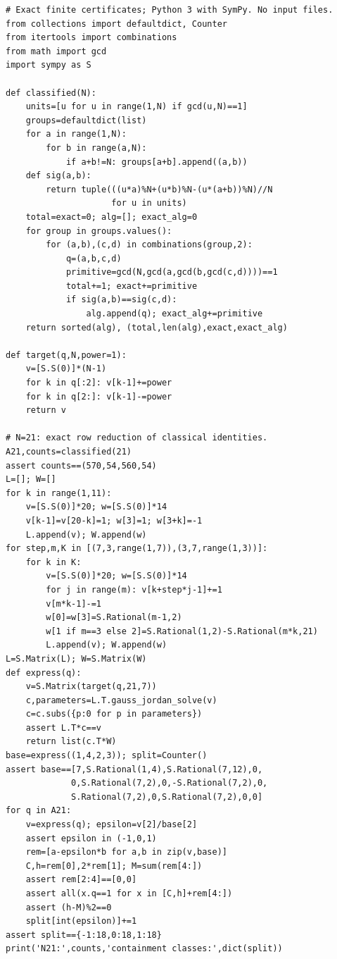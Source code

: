 \documentclass[11pt,a4paper]{article}
\theoremstyle{definition}
\theoremstyle{remark}
\numberwithin{equation}{section}
\begin{document}
{\scriptsize
\begin{verbatim}
# Exact finite certificates; Python 3 with SymPy. No input files.
from collections import defaultdict, Counter
from itertools import combinations
from math import gcd
import sympy as S

def classified(N):
    units=[u for u in range(1,N) if gcd(u,N)==1]
    groups=defaultdict(list)
    for a in range(1,N):
        for b in range(a,N):
            if a+b!=N: groups[a+b].append((a,b))
    def sig(a,b):
        return tuple(((u*a)%N+(u*b)%N-(u*(a+b))%N)//N
                     for u in units)
    total=exact=0; alg=[]; exact_alg=0
    for group in groups.values():
        for (a,b),(c,d) in combinations(group,2):
            q=(a,b,c,d)
            primitive=gcd(N,gcd(a,gcd(b,gcd(c,d))))==1
            total+=1; exact+=primitive
            if sig(a,b)==sig(c,d):
                alg.append(q); exact_alg+=primitive
    return sorted(alg), (total,len(alg),exact,exact_alg)

def target(q,N,power=1):
    v=[S.S(0)]*(N-1)
    for k in q[:2]: v[k-1]+=power
    for k in q[2:]: v[k-1]-=power
    return v

# N=21: exact row reduction of classical identities.
A21,counts=classified(21)
assert counts==(570,54,560,54)
L=[]; W=[]
for k in range(1,11):
    v=[S.S(0)]*20; w=[S.S(0)]*14
    v[k-1]=v[20-k]=1; w[3]=1; w[3+k]=-1
    L.append(v); W.append(w)
for step,m,K in [(7,3,range(1,7)),(3,7,range(1,3))]:
    for k in K:
        v=[S.S(0)]*20; w=[S.S(0)]*14
        for j in range(m): v[k+step*j-1]+=1
        v[m*k-1]-=1
        w[0]=w[3]=S.Rational(m-1,2)
        w[1 if m==3 else 2]=S.Rational(1,2)-S.Rational(m*k,21)
        L.append(v); W.append(w)
L=S.Matrix(L); W=S.Matrix(W)
def express(q):
    v=S.Matrix(target(q,21,7))
    c,parameters=L.T.gauss_jordan_solve(v)
    c=c.subs({p:0 for p in parameters})
    assert L.T*c==v
    return list(c.T*W)
base=express((1,4,2,3)); split=Counter()
assert base==[7,S.Rational(1,4),S.Rational(7,12),0,
             0,S.Rational(7,2),0,-S.Rational(7,2),0,
             S.Rational(7,2),0,S.Rational(7,2),0,0]
for q in A21:
    v=express(q); epsilon=v[2]/base[2]
    assert epsilon in (-1,0,1)
    rem=[a-epsilon*b for a,b in zip(v,base)]
    C,h=rem[0],2*rem[1]; M=sum(rem[4:])
    assert rem[2:4]==[0,0]
    assert all(x.q==1 for x in [C,h]+rem[4:])
    assert (h-M)%2==0
    split[int(epsilon)]+=1
assert split=={-1:18,0:18,1:18}
print('N21:',counts,'containment classes:',dict(split))


\end{verbatim}}
\end{document}
